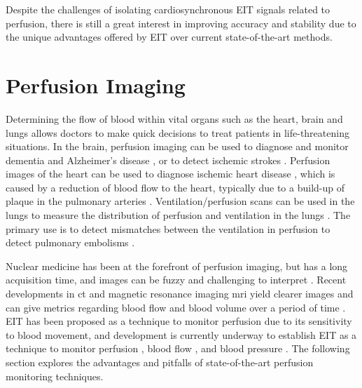 Despite the challenges of isolating cardiosynchronous EIT signals related to 
perfusion, there is still a great interest in 
improving accuracy and stability due to the unique 
advantages offered by EIT over current state-of-the-art methods.

\section{Perfusion Imaging}

Determining the flow of blood within vital organs such as the heart, brain and lungs 
allows doctors to make quick decisions to treat patients in life-threatening situations.
In the brain,  perfusion imaging can be used to diagnose and monitor dementia
and Alzheimer's disease \parencite{dougall_systematic_2004,barker_pathophysiology_2014},
or to detect ischemic strokes 
\parencite{koenig_perfusion_1998,konstas_theoretic_2009}. 
Perfusion images of the heart can be used to diagnose ischemic 
heart disease \parencite{prvulovich_role_1998}, which is caused by a reduction 
of blood flow to the heart, typically due to 
a build-up of plaque in the pulmonary arteries
\parencite{mendis_global_2011}. Ventilation/perfusion scans can be used in the 
lungs to measure the distribution of perfusion and ventilation in the lungs 
\parencite{mortensen_lung_2019}. The primary use 
is to detect mismatches between the ventilation in perfusion to detect pulmonary 
embolisms \parencite{pioped-investigators_value_1990}.   

Nuclear medicine has been at the forefront of perfusion imaging, but has a long
acquisition time, and images can be fuzzy and 
challenging to interpret \parencite{prvulovich_role_1998}. 
Recent developments in \acrfull{ct} and magnetic resonance imaging \acrshort{mri} 
yield clearer images and can give metrics 
regarding blood flow and blood volume over a period of 
time \parencite{prvulovich_role_1998}. 
EIT has been proposed as a technique to monitor perfusion due 
to its sensitivity to blood movement, 
and development is currently underway to 
establish EIT as a technique to monitor 
perfusion \parencite{nguyen_review_2012,nguyen_perfusion_2015}, 
blood flow \parencite{braun_limitations_2018,braun_accuracy_2018}, and 
blood pressure \parencite{proenca_noninvasive_2017,proenca_non-invasive_2020}. 
The following section 
explores the advantages and pitfalls of state-of-the-art perfusion monitoring techniques. 


